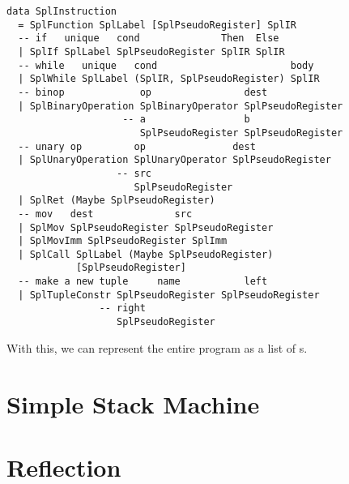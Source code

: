 \begin{verbatim}
data SplInstruction
  = SplFunction SplLabel [SplPseudoRegister] SplIR
  -- if   unique   cond              Then  Else
  | SplIf SplLabel SplPseudoRegister SplIR SplIR
  -- while   unique   cond                       body
  | SplWhile SplLabel (SplIR, SplPseudoRegister) SplIR
  -- binop             op                dest
  | SplBinaryOperation SplBinaryOperator SplPseudoRegister
                    -- a                 b
                       SplPseudoRegister SplPseudoRegister
  -- unary op         op               dest
  | SplUnaryOperation SplUnaryOperator SplPseudoRegister
                   -- src
                      SplPseudoRegister
  | SplRet (Maybe SplPseudoRegister)
  -- mov   dest              src
  | SplMov SplPseudoRegister SplPseudoRegister
  | SplMovImm SplPseudoRegister SplImm
  | SplCall SplLabel (Maybe SplPseudoRegister)
            [SplPseudoRegister]
  -- make a new tuple     name           left
  | SplTupleConstr SplPseudoRegister SplPseudoRegister
                -- right
                   SplPseudoRegister
\end{verbatim}

With this, we can represent the entire program as a list of s.





\section{Simple Stack Machine}


\section{Reflection}


